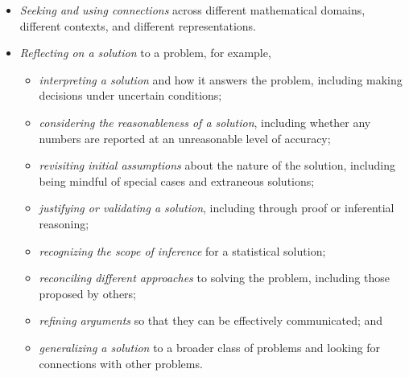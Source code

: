 {{\begin{itemize}
\begin{itemize}
      \item \emph{monitoring progress toward a solution}, including reviewing a chosen strategy and other possible strategies generated by oneself or others.
    \end{itemize}

    \item \emph{Seeking and using connections} across different mathematical domains, different contexts, and different representations.
    
    \item \emph{Reflecting on a solution} to a problem, for example,
    \begin{itemize}
      \item \emph{interpreting a solution} and how it answers the problem, including making decisions under uncertain conditions;
      
      \item \emph{considering the reasonableness of a solution}, including whether any numbers are reported at an unreasonable level of accuracy;
      
      \item \emph{revisiting initial assumptions} about the nature of the solution, including being mindful of special cases and extraneous solutions;
      
      \item \emph{justifying or validating a solution}, including through proof or inferential reasoning;\vspace{\baselineskip}
      
      \item \emph{recognizing the scope of inference} for a statistical solution;
      
      \item \emph{reconciling different approaches} to solving the problem, including those proposed by others;
      
      \item \emph{refining arguments} so that they can be effectively communicated; and
      
      \item \emph{generalizing a solution} to a broader class of problems and looking for connections with other problems.
    \end{itemize}
  \end{itemize}
  }
  }
